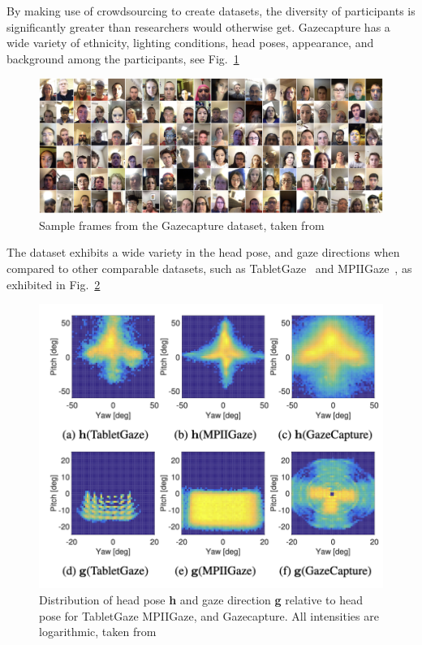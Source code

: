 \documentclass[twocolumn]{report}
\begin{document}
By making use of crowdsourcing to create datasets, the diversity of participants is significantly greater than researchers would otherwise get. Gazecapture has a wide variety of ethnicity, lighting conditions, head poses, appearance, and background among the participants, see Fig.~\ref{fig:gazecapture-sample}

\begin{figure}[h]
    \begin{center}
        \includegraphics[scale=0.25]{../assets/Screenshot 2024-04-11 at 12.49.10.png}
    \end{center}
    \caption{Sample frames from the Gazecapture dataset, taken from~\cite{krafka2016eye}}
    \label{fig:gazecapture-sample}
\end{figure}

The dataset exhibits a wide variety in the head pose, and gaze directions when compared to other comparable datasets, such as TabletGaze~\cite{huang2016tabletgaze} and MPIIGaze~\cite{zhang15cvpr}, as exhibited in Fig.~\ref{fig:gazecapture-distribution}

\begin{figure}[h]
    \begin{center}
        \includegraphics[scale=0.5]{../assets/Screenshot 2024-04-11 at 13.09.16.png}
    \end{center}
    \caption{Distribution of head pose \textbf{h} and gaze direction \textbf{g} relative to head pose for TabletGaze MPIIGaze, and Gazecapture. All intensities are logarithmic, taken from~\cite{krafka2016eye}}
    \label{fig:gazecapture-distribution}
\end{figure}
\end{document}
